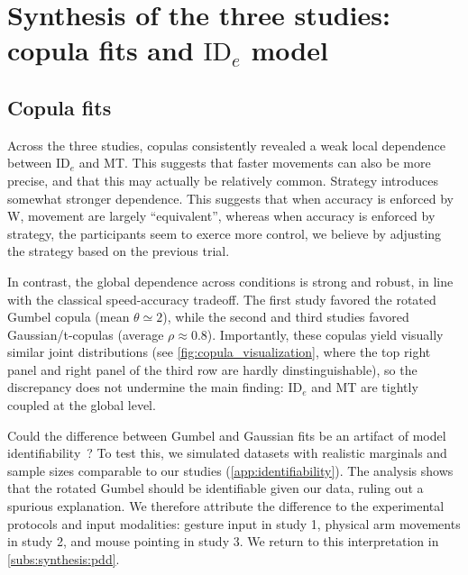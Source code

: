 \documentclass[acmlarge, manuscript,review]{acmart}
\newcommand{\ide}{\ensuremath{{\text{ID}_e}}\xspace}
\begin{document}
\section{Synthesis of the three studies: copula fits and \ide model}


\subsection{Copula fits}
Across the three studies, copulas consistently revealed a weak local dependence between \ide and MT. This suggests that faster movements can also be more precise, and that this may actually be relatively common. Strategy introduces somewhat stronger dependence. This suggests that when accuracy is enforced by W, movement are largely ``equivalent'', whereas when accuracy is enforced by strategy, the participants seem to exerce more control, we believe \eg by adjusting the strategy based on the previous trial.

In contrast, the global dependence across conditions is strong and robust, in line with the classical speed-accuracy tradeoff. The first study favored the rotated Gumbel copula (mean $\theta \simeq 2$), while the second and third studies favored Gaussian/t-copulas (average $\rho \approx 0.8$). Importantly, these copulas yield visually similar joint distributions (see \autoref{fig:copula_visualization}, where the top right panel and right panel of the third row are hardly dinstinguishable), so the discrepancy does not undermine the main finding: \ide and MT are tightly coupled at the global level.

Could the difference between Gumbel and Gaussian fits be an artifact of model identifiability~\cite{gori2024, wilson2019}? To test this, we simulated datasets with realistic marginals and sample sizes comparable to our studies (\autoref{app:identifiability}). The analysis shows that the rotated Gumbel should be identifiable given our data, ruling out a spurious explanation. We therefore attribute the difference to the experimental protocols and input modalities: gesture input in study 1, physical arm movements in study 2, and mouse pointing in study 3. We return to this interpretation in \autoref{subs:synthesis:pdd}.


\end{document}
